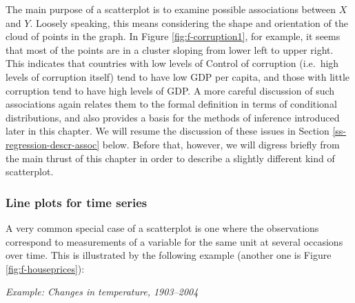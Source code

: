 \documentclass[11pt,a4paper,openany]{book}
\begin{document}
The main purpose of a scatterplot is to examine possible associations
between \(X\) and \(Y\). Loosely speaking, this means considering the
shape and orientation of the cloud of points in the graph. In Figure
\ref{fig:f-corruption1}, for example, it seems that most of the points
are in a cluster sloping from lower left to upper right. This indicates
that countries with low levels of Control of corruption (i.e.~high
levels of corruption itself) tend to have low GDP per capita, and those
with little corruption tend to have high levels of GDP. A more careful
discussion of such associations again relates them to the formal
definition in terms of conditional distributions, and also provides a
basis for the methods of inference introduced later in this chapter. We
will resume the discussion of these issues in Section
\ref{ss-regression-descr-assoc} below. Before that, however, we will
digress briefly from the main thrust of this chapter in order to
describe a slightly different kind of scatterplot.

\subsubsection*{Line plots for time
series}\label{line-plots-for-time-series}

A very common special case of a scatterplot is one where the
observations correspond to measurements of a variable for the same unit
at several occasions over time. This is illustrated by the following
example (another one is Figure \ref{fig:f-houseprices}):

\emph{Example: Changes in temperature, 1903--2004}
\end{document}
